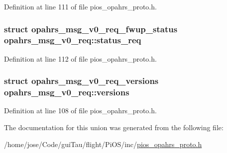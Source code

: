 Definition at line 111 of file pios\-\_\-opahrs\-\_\-proto.\-h.

\hypertarget{unionopahrs__msg__v0__req_a490017a1017d529f7bec057577d0a9ae}{
\subsubsection[{status\-\_\-req}]{\setlength{\rightskip}{0pt plus 5cm}struct {\bf opahrs\-\_\-msg\-\_\-v0\-\_\-req\-\_\-fwup\-\_\-status} opahrs\-\_\-msg\-\_\-v0\-\_\-req\-::status\-\_\-req}}\label{unionopahrs__msg__v0__req_a490017a1017d529f7bec057577d0a9ae}


Definition at line 112 of file pios\-\_\-opahrs\-\_\-proto.\-h.

\hypertarget{unionopahrs__msg__v0__req_a814872efb9f992c52dd61f95c10b0366}{
\subsubsection[{versions}]{\setlength{\rightskip}{0pt plus 5cm}struct {\bf opahrs\-\_\-msg\-\_\-v0\-\_\-req\-\_\-versions} opahrs\-\_\-msg\-\_\-v0\-\_\-req\-::versions}}\label{unionopahrs__msg__v0__req_a814872efb9f992c52dd61f95c10b0366}


Definition at line 108 of file pios\-\_\-opahrs\-\_\-proto.\-h.



The documentation for this union was generated from the following file\-:\begin{DoxyCompactItemize}
\item 
/home/jose/\-Code/gui\-Tau/flight/\-Pi\-O\-S/inc/\hyperlink{pios__opahrs__proto_8h}{pios\-\_\-opahrs\-\_\-proto.\-h}\end{DoxyCompactItemize}
